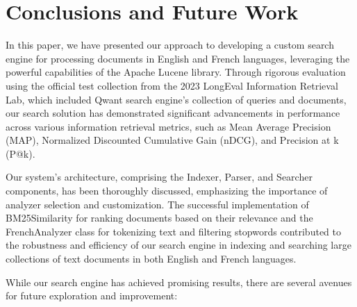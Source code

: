 \section{Conclusions and Future Work}
\label{sec:conclusion}

In this paper, we have presented our approach to developing a custom search engine for processing documents in English and French languages, leveraging the powerful capabilities of the Apache Lucene library. Through rigorous evaluation using the official test collection from the 2023 LongEval Information Retrieval Lab, which included Qwant search engine's collection of queries and documents, our search solution has demonstrated significant advancements in performance across various information retrieval metrics, such as Mean Average Precision (MAP), Normalized Discounted Cumulative Gain (nDCG), and Precision at k (P@k).

Our system's architecture, comprising the Indexer, Parser, and Searcher components, has been thoroughly discussed, emphasizing the importance of analyzer selection and customization. The successful implementation of BM25Similarity for ranking documents based on their relevance and the FrenchAnalyzer class for tokenizing text and filtering stopwords contributed to the robustness and efficiency of our search engine in indexing and searching large collections of text documents in both English and French languages.

While our search engine has achieved promising results, there are several avenues for future exploration and improvement:

